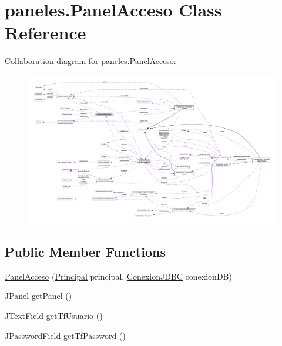 \hypertarget{classpaneles_1_1_panel_acceso}{}\section{paneles.\+Panel\+Acceso Class Reference}
\label{classpaneles_1_1_panel_acceso}


Collaboration diagram for paneles.\+Panel\+Acceso\+:
\nopagebreak
\begin{figure}[H]
\begin{center}
\leavevmode
\includegraphics[width=350pt]{classpaneles_1_1_panel_acceso__coll__graph}
\end{center}
\end{figure}
\subsection*{Public Member Functions}
\begin{DoxyCompactItemize}
\item 
\mbox{\hyperlink{classpaneles_1_1_panel_acceso_ab19590219a09f461529209808b8dbd25}{Panel\+Acceso}} (\mbox{\hyperlink{classvistas_1_1_principal}{Principal}} principal, \mbox{\hyperlink{classmysql_1_1_conexion_j_d_b_c}{Conexion\+J\+D\+BC}} conexion\+DB)
\item 
J\+Panel \mbox{\hyperlink{classpaneles_1_1_panel_acceso_ac978a2c0e1aef22aa66b19abe354b02b}{get\+Panel}} ()
\item 
J\+Text\+Field \mbox{\hyperlink{classpaneles_1_1_panel_acceso_a2e9e57df2c86935dcee9830931a7d3ec}{get\+Tf\+Usuario}} ()
\item 
J\+Password\+Field \mbox{\hyperlink{classpaneles_1_1_panel_acceso_acff0ecd448fa0435276817069e088492}{get\+Tf\+Password}} ()
\end{DoxyCompactItemize}


